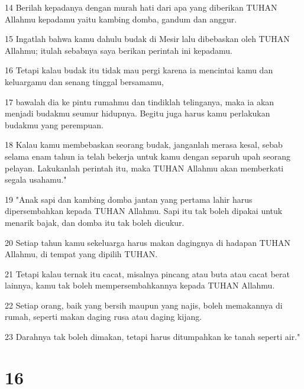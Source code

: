 \par 14 Berilah kepadanya dengan murah hati dari apa yang diberikan TUHAN Allahmu kepadamu yaitu kambing domba, gandum dan anggur.
\par 15 Ingatlah bahwa kamu dahulu budak di Mesir lalu dibebaskan oleh TUHAN Allahmu; itulah sebabnya saya berikan perintah ini kepadamu.
\par 16 Tetapi kalau budak itu tidak mau pergi karena ia mencintai kamu dan keluargamu dan senang tinggal bersamamu,
\par 17 bawalah dia ke pintu rumahmu dan tindiklah telinganya, maka ia akan menjadi budakmu seumur hidupnya. Begitu juga harus kamu perlakukan budakmu yang perempuan.
\par 18 Kalau kamu membebaskan seorang budak, janganlah merasa kesal, sebab selama enam tahun ia telah bekerja untuk kamu dengan separuh upah seorang pelayan. Lakukanlah perintah itu, maka TUHAN Allahmu akan memberkati segala usahamu."
\par 19 "Anak sapi dan kambing domba jantan yang pertama lahir harus dipersembahkan kepada TUHAN Allahmu. Sapi itu tak boleh dipakai untuk menarik bajak, dan domba itu tak boleh dicukur.
\par 20 Setiap tahun kamu sekeluarga harus makan dagingnya di hadapan TUHAN Allahmu, di tempat yang dipilih TUHAN.
\par 21 Tetapi kalau ternak itu cacat, misalnya pincang atau buta atau cacat berat lainnya, kamu tak boleh mempersembahkannya kepada TUHAN Allahmu.
\par 22 Setiap orang, baik yang bersih maupun yang najis, boleh memakannya di rumah, seperti makan daging rusa atau daging kijang.
\par 23 Darahnya tak boleh dimakan, tetapi harus ditumpahkan ke tanah seperti air."

\chapter{16}

